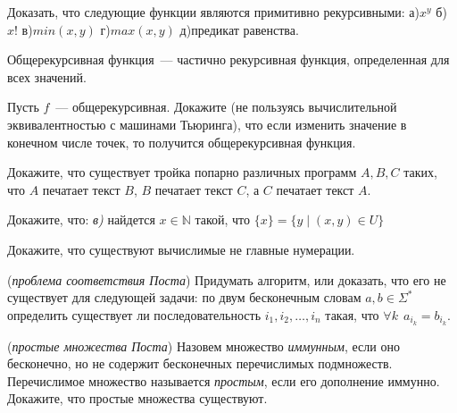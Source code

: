 \begin{task}
    Доказать, что следующие функции являются примитивно рекурсивными:
    а)$x^y$
    б)$x!$
    в)$min(x, y)$
    г)$max(x, y)$
    д)предикат равенства.
\end{task}

Общерекурсивная функция~--- частично рекурсивная функция, определенная
для всех значений.

\begin{task}
    Пусть $f$~--- общерекурсивная. Докажите (не пользуясь
    вычислительной эквивалентностью с машинами Тьюринга), что если
    изменить значение в конечном числе точек, то получится
    общерекурсивная функция.
\end{task}

\breakline

\begin{ptask}{16}
    Докажите, что существует тройка попарно различных программ $A, B,
    C$ таких, что $A$ печатает текст $B$, $B$ печатает текст $C$, а
    $C$ печатает текст $A$.
\end{ptask}

\begin{ptask}{19}
    Докажите, что:
    {\it в)} найдется $x \in \mathbb{N}$ такой, что $\{x\} = \{y
    \mid (x, y) \in U\}$
\end{ptask}

\begin{ptask}{20}
    Докажите, что существуют вычислимые не главные нумерации.
\end{ptask}

\begin{ptask}{21} ({\it проблема соответствия Поста})
    Придумать алгоритм, или доказать, что его не существует для
    следующей задачи: по двум бесконечным словам $a, b \in \Sigma^*$
    определить существует ли последовательность $i_1, i_2, \dots, i_n$
	такая, что $\forall k ~~ a_{i_k} = b_{i_k}$.
\end{ptask}

\begin{ptask}{23} ({\it простые множества Поста})
    Назовем множество {\it иммунным}, если оно бесконечно, но не
    содержит бесконечных перечислимых подмножеств. Перечислимое
    множество называется {\it простым}, если его дополнение иммунно.
    Докажите, что простые множества существуют.
\end{ptask}